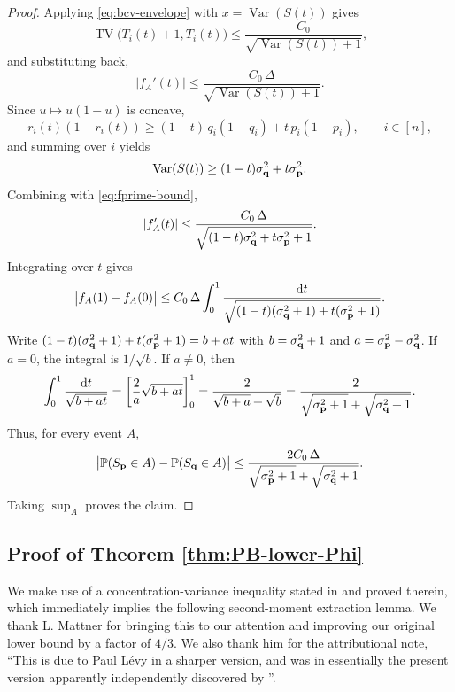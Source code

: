 \documentclass[11pt]{amsart}
\theoremstyle{plain}
\theoremstyle{definition}
\DeclareMathOperator{\TV}{TV}
\DeclareMathOperator{\Var}{Var}
\renewcommand{\P}{\mathbb{P}}
\newcommand{\CBCV}{C_0}
\renewcommand{\vec}[1]{\textup{{\bf #1}}}
\begin{document}
\begin{proof}
Applying \eqref{eq:bcv-envelope} with $x=\Var(S(t))$ gives
\[
\TV\!\bigl(T_i(t)+1,T_i(t)\bigr)
\le
\frac{\CBCV}{\sqrt{\Var(S(t))+1}},
\]
and substituting back,
\begin{equation}\label{eq:fprime-bound}
|f_A'(t)|\le \frac{\CBCV\,\Delta}{\sqrt{\Var(S(t))+1}}.
\end{equation}
Since $u\mapsto u(1-u)$ is concave,
\[
r_i(t)(1-r_i(t))
\ge
(1-t)\,q_i(1-q_i)+t\,p_i(1-p_i),
\qquad
i\in[n],
\]
and summing over $i$ yields
\[
\Var(S(t))
\ge
(1-t)\sigma_{\vec{q}}^2+t\sigma_{\vec{p}}^2.
\]
Combining with \eqref{eq:fprime-bound},
\[
|f_A'(t)|
\le
\frac{\CBCV\,\Delta}{\sqrt{(1-t)\sigma_{\vec{q}}^2+t\sigma_{\vec{p}}^2+1}}.
\]
Integrating over $t$ gives
\[
\bigl|f_A(1)-f_A(0)\bigr|
\le
\CBCV\,\Delta\int_0^1 \frac{\mathrm{d}t}{\sqrt{(1-t)(\sigma_{\vec{q}}^2+1)+t(\sigma_{\vec{p}}^2+1)}}.
\]
Write $(1-t)(\sigma_{\vec{q}}^2+1)+t(\sigma_{\vec{p}}^2+1)=b+at$ with
$b=\sigma_{\vec{q}}^2+1$ and $a=\sigma_{\vec{p}}^2-\sigma_{\vec{q}}^2$.
If $a=0$, the integral is $1/\sqrt{b}$.
If $a\neq 0$, then
\[
\int_0^1 \frac{\mathrm{d}t}{\sqrt{b+at}}
=
\left[\frac{2}{a}\sqrt{b+at}\right]_{0}^{1}
=
\frac{2}{\sqrt{b+a}+\sqrt b}
=
\frac{2}{\sqrt{\sigma_{\vec{p}}^2+1}+\sqrt{\sigma_{\vec{q}}^2+1}}.
\]
Thus, for every event $A$,
\[
\bigl|\P(S_{\vec{p}}\in A)-\P(S_{\vec{q}}\in A)\bigr|
\le
\frac{2\CBCV\,\Delta}{\sqrt{\sigma_{\vec{p}}^2+1}+\sqrt{\sigma_{\vec{q}}^2+1}}.
\]
Taking $\sup_A$ proves the claim.
\end{proof}

\subsection{Proof of Theorem \ref{thm:PB-lower-Phi}}

We make use of a
concentration-variance inequality
stated in
\cite[Disp. (18)]{MattnerSchulz2018NormalApproximations}
and proved therein,
which immediately implies the following 
second-moment extraction
lemma. We thank 
L. Mattner
\cite{Mattner2026} for bringing this to our attention and improving our original
lower bound by a factor of $4/3$.
We also thank him for the
attributional note, ``This is due to Paul Lévy in a sharper version,
and was in essentially the present version apparently independently
discovered by \cite[Corollary 2.2]{BobkovChistyakov2015}''.
\end{document}
